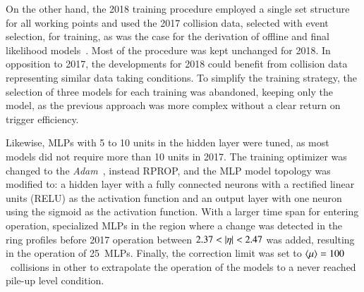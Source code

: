 

On the other hand, the 2018 training procedure employed a single set structure for all working points and used the 2017 collision data, selected with  \Zee{} \tnp{} event selection, for training, as was the case for the derivation of offline and final \hlt likelihood models~\cite{aaboud2019electron}.
Most of the procedure was kept unchanged for 2018. In opposition to 2017, the developments for 2018 could benefit from collision data representing similar data taking conditions. To simplify the training strategy, the selection of three models for each training was abandoned, keeping only the \spmax{} model, as the previous approach was more complex without a clear return on trigger efficiency. 

Likewise, MLPs with 5 to 10 units in the hidden layer were tuned, as most models did not require more than 10 units in 2017. The training optimizer was changed to the \emph{Adam}~\cite{kingma2014adam}, instead RPROP, and the MLP model topology was modified to: a hidden layer with a fully connected neurons with a rectified linear units (RELU) as the activation function and an output layer with one neuron using the sigmoid as the activation function. With a larger time span for entering operation, specialized MLPs in the region where a change was detected in the ring profiles before 2017 operation between $2.37<\abseta<2.47$ was added, resulting in the operation of \SI{25}{MLPs}. Finally, the correction limit was set to $\langle \mu \rangle{}=100$~collisions in other to extrapolate the operation of the models to a never reached pile-up level condition. 





